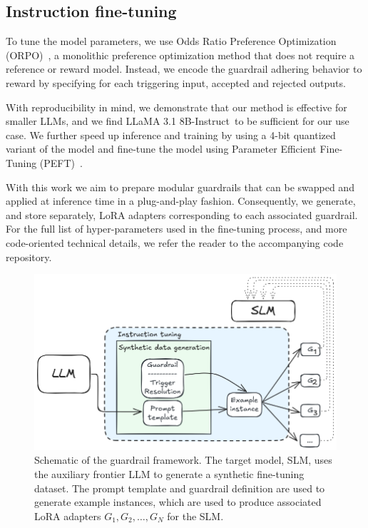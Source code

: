 \documentclass[letterpaper]{article}
\newcommand{\slmm}{LLaMA 3.1 8B-Instruct}
\begin{document}
\subsection{Instruction fine-tuning}
To tune the model parameters, we use Odds Ratio Preference Optimization (ORPO)~\cite{hong2024orpo}, a monolithic preference optimization method that does not require a reference or reward model. Instead, we encode the guardrail adhering behavior to reward by specifying for each triggering input, accepted and rejected outputs.

With reproducibility in mind, we demonstrate that our method is effective for smaller LLMs, and we find \slmm~to be sufficient for our use case. We further speed up inference and training by using a 4-bit quantized variant of the model and fine-tune the model using Parameter Efficient Fine-Tuning (PEFT)~\cite{unsloth, hu2021lora}. 

With this work we aim to prepare modular guardrails that can be swapped and applied at inference time in a plug-and-play fashion.  Consequently, we generate, and store separately, LoRA adapters corresponding to each associated guardrail. For the full list of hyper-parameters used in the fine-tuning process, and more code-oriented technical details, we refer the reader to the accompanying code repository.
\begin{figure}[!ht]
	\centering
	\includegraphics[width=1.0\linewidth]{figures/datagenSchematic.png}
	\caption{Schematic of the guardrail framework. The target model, SLM, uses the auxiliary frontier LLM to generate a synthetic fine-tuning dataset. The prompt template and guardrail definition are used to generate example instances, which are used to produce associated LoRA adapters $G_1, G_2, \ldots, G_N$ for the SLM.}\label{fig:method-schematic-label}
\end{figure} 
\end{document}

